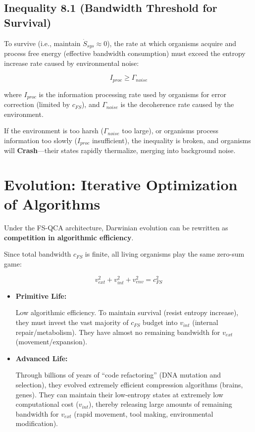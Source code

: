 \subsection{Inequality 8.1 (Bandwidth Threshold for Survival)}

To survive (i.e., maintain $\dot{S}_{sys} \approx 0$), the rate at which organisms acquire and process free energy (effective bandwidth consumption) must exceed the entropy increase rate caused by environmental noise:

$$I_{proc} \ge \Gamma_{noise}$$

where $I_{proc}$ is the information processing rate used by organisms for error correction (limited by $c_{FS}$), and $\Gamma_{noise}$ is the decoherence rate caused by the environment.

If the environment is too harsh ($\Gamma_{noise}$ too large), or organisms process information too slowly ($I_{proc}$ insufficient), the inequality is broken, and organisms will \textbf{Crash}---their states rapidly thermalize, merging into background noise.

\section{Evolution: Iterative Optimization of Algorithms}

Under the FS-QCA architecture, Darwinian evolution can be rewritten as \textbf{competition in algorithmic efficiency}.

Since total bandwidth $c_{FS}$ is finite, all living organisms play the same zero-sum game:

$$v_{ext}^2 + v_{int}^2 + v_{env}^2 = c_{FS}^2$$

\begin{itemize}
\item \textbf{Primitive Life:}

   Low algorithmic efficiency. To maintain survival (resist entropy increase), they must invest the vast majority of $c_{FS}$ budget into $v_{int}$ (internal repair/metabolism). They have almost no remaining bandwidth for $v_{ext}$ (movement/expansion).

\item \textbf{Advanced Life:}

   Through billions of years of ``code refactoring'' (DNA mutation and selection), they evolved extremely efficient compression algorithms (brains, genes). They can maintain their low-entropy states at extremely low computational cost ($v_{int}$), thereby releasing large amounts of remaining bandwidth for $v_{ext}$ (rapid movement, tool making, environmental modification).
\end{itemize}

